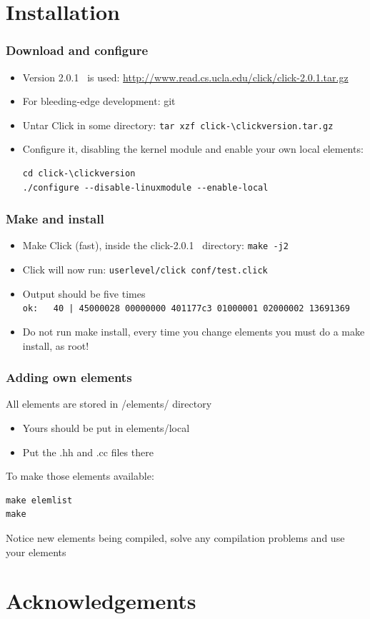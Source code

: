 \documentclass{beamer}
\newcommand{\clickversion}{2.0.1}
\begin{document}
\section{Installation}
\begin{frame}[fragile]
\frametitle{Download and configure}
\begin{itemize}
	\item Version \clickversion~ is used: \url{http://www.read.cs.ucla.edu/click/click-\clickversion.tar.gz }
	\item For bleeding-edge development: git
	\item Untar Click in some directory: \lstinline!tar xzf click-\clickversion.tar.gz!
	\item Configure it, disabling the kernel module and enable your own local elements:
	\begin{lstlisting}
cd click-\clickversion
./configure --disable-linuxmodule --enable-local
\end{lstlisting}
\end{itemize}

\end{frame}
\begin{frame}[fragile]
	\frametitle{Make and install}
\begin{itemize}
	\item Make Click (fast), inside the click-\clickversion~ directory: \lstinline!make -j2!
	\item Click will now run: \lstinline!userlevel/click conf/test.click!
	\item Output should be five times \\ \lstinline!ok:   40 | 45000028 00000000 401177c3 01000001 02000002 13691369!
	\item Do not run make install, every time you change elements you must do a make install, as root!
\end{itemize}	
\end{frame}

\begin{frame}[fragile]
	\frametitle{Adding own elements}
All elements are stored in /elements/ directory
\begin{itemize}
	\item Yours should be put in elements/local
	\item Put the .hh and .cc files there
\end{itemize}
To make those elements available:
\begin{lstlisting}
make elemlist
make
\end{lstlisting}
Notice new elements being compiled, solve any compilation problems and use your elements
\end{frame}

\section*{Acknowledgements}
\end{document}

